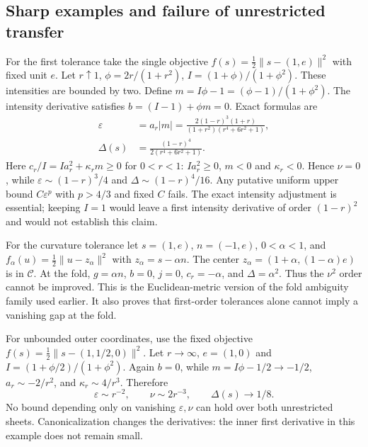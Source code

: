 \subsection{Sharp examples and failure of unrestricted transfer}
For the first tolerance take the single objective $f(s)=\tfrac12\|s-(1,e)\|^2$ with fixed unit $e$. Let $r\uparrow1$, $\phi=2r/(1+r^2)$, $I=(1+\phi)/(1+\phi^2)$. These intensities are bounded by two. Define $m=I\phi-1=(\phi-1)/(1+\phi^2)$. The intensity derivative satisfies $b=(I-1)+\phi m=0$. Exact formulas are
\begin{equation}
 \begin{aligned}
 \varepsilon&=a_r|m|
 =\frac{2(1-r)^3(1+r)}{(1+r^2)(r^4+6r^2+1)},\\
 \Delta(s)&=\frac{(1-r)^4}{2(r^4+6r^2+1)}.
 \end{aligned}
 \label{SI-eq:ssharpexact}
\end{equation}
Here $c_r/I=Ia_r^2+\kappa_rm\ge0$ for $0<r<1$: $I a_r^2\ge0$, $m<0$ and $\kappa_r<0$. Hence $\nu=0$, while $\varepsilon\sim(1-r)^3/4$ and $\Delta\sim(1-r)^4/16$. Any putative uniform upper bound $C\varepsilon^p$ with $p>4/3$ and fixed $C$ fails. The exact intensity adjustment is essential; keeping $I=1$ would leave a first intensity derivative of order $(1-r)^2$ and would not establish this claim.

For the curvature tolerance let $s=(1,e)$, $n=(-1,e)$, $0<\alpha<1$, and $f_\alpha(u)=\tfrac12\|u-z_\alpha\|^2$ with $z_\alpha=s-\alpha n$. The center $z_\alpha=(1+\alpha,(1-\alpha)e)$ is in $\mathcal C$. At the fold, $g=\alpha n$, $b=0$, $j=0$, $c_r=-\alpha$, and $\Delta=\alpha^2$. Thus the $\nu^2$ order cannot be improved. This is the Euclidean-metric version of the fold ambiguity family used earlier. It also proves that first-order tolerances alone cannot imply a vanishing gap at the fold.

For unbounded outer coordinates, use the fixed objective $f(s)=\tfrac12\|s-(1,1/2,0)\|^2$. Let $r\to\infty$, $e=(1,0)$ and $I=(1+\phi/2)/(1+\phi^2)$. Again $b=0$, while $m=I\phi-1/2\to-1/2$, $a_r\sim-2/r^2$, and $\kappa_r\sim4/r^3$. Therefore
\begin{equation}
 \varepsilon\sim r^{-2},\qquad\nu\sim2r^{-3},\qquad\Delta(s)\to1/8.
 \label{SI-eq:sstopoutercounter}
\end{equation}
No bound depending only on vanishing $\varepsilon,\nu$ can hold over both unrestricted sheets. Canonicalization changes the derivatives: the inner first derivative in this example does not remain small.

